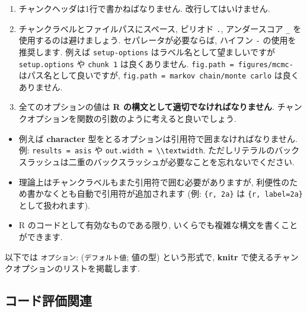 \documentclass[
  11pt,
  lualatex,ja=standard,jafont=noto]{bxjsreport}
\providecommand{\tightlist}{%
  \setlength{\itemsep}{0pt}\setlength{\parskip}{0pt}}
\begin{document}
\begin{enumerate}
\def\labelenumi{\arabic{enumi}.}
\tightlist
\item
  チャンクヘッダは1行で書かねばなりません. 改行してはいけません.
\item
  チャンクラベルとファイルパスにスペース, ピリオド \texttt{.}, アンダースコア \texttt{\_} を使用するのは避けましょう. セパレータが必要ならば, ハイフン \texttt{-} の使用を推奨します. 例えば \texttt{setup-options} はラベル名として望ましいですが \texttt{setup.options} や \texttt{chunk 1} は良くありません. \texttt{fig.path = \textquotesingle{}figures/mcmc-\textquotesingle{}} はパス名として良いですが, \texttt{fig.path = \textquotesingle{}markov\ chain/monte\ carlo\textquotesingle{}} は良くありません.
\item
  全てのオプションの値は \textbf{R の構文として適切でなければなりません}. チャンクオプションを関数の引数のように考えると良いでしょう.
\end{enumerate}

\begin{itemize}
\tightlist
\item
  例えば \textbf{character} 型をとるオプションは引用符で囲まなければなりません. 例: \texttt{results = \textquotesingle{}asis\textquotesingle{}} や \texttt{out.width = \textquotesingle{}\textbackslash{}\textbackslash{}textwidth\textquotesingle{}}. ただしリテラルのバックスラッシュは二重のバックスラッシュが必要なことを忘れないでください.
\item
  理論上はチャンクラベルもまた引用符で囲む必要がありますが, 利便性のため書かなくとも自動で引用符が追加されます (例: \texttt{\textasciigrave{}\textasciigrave{}\textasciigrave{}\{r,\ 2a\}\textasciigrave{}\textasciigrave{}\textasciigrave{}} は \texttt{\textasciigrave{}\textasciigrave{}\textasciigrave{}\{r,\ label=\textquotesingle{}2a\textquotesingle{}\}\textasciigrave{}\textasciigrave{}\textasciigrave{}} として扱われます).
\item
  R のコードとして有効なものである限り, いくらでも複雑な構文を書くことができます.
\end{itemize}

以下では \texttt{オプション}: (\texttt{デフォルト値}; 値の型) という形式で, \textbf{knitr} で使えるチャンクオプションのリストを掲載します.

\hypertarget{evaluate}{%
\subsection{コード評価関連}\label{evaluate}}
\end{document}

